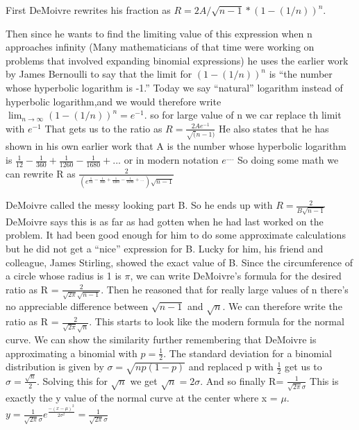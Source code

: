 \documentclass{article}
\begin{document}
First DeMoivre rewrites his fraction as   $ R= 2A/ \sqrt{n-1} * (1-(1/n))^{n} $.

Then since he wants to find the limiting value of this expression when n approaches infinity (Many mathematicians of that time were working on problems that involved expanding binomial expressions) he uses the earlier work by James Bernoulli to say that the limit for $ (1-(1/n))^{n} $ is “the number
whose hyperbolic logarithm is -1.” Today we say “natural” logarithm instead of hyperbolic logarithm,and we would therefore write $ \lim_{n\to\infty}  (1-(1/n))^{n}  = e^{-1}  $.
so for large value of n we car replace th limit with $ e^{-1} $
That gets us to the ratio as $ R=  \frac {2Ae^{-1}}{\sqrt(n-1)} $
He also states that he has shown in his own earlier work that A is the number whose hyperbolic logarithm is $ \frac{1}{12} - \frac{1}{360} + \frac{1}{1260} - \frac{1}{1680} + ...  $  or in modern notation $ e^{....} $
So doing some math we can rewrite R as $ \frac{2}{(e^{ \frac{1}{12} - \frac{1}{360} + \frac{1}{1260} - \frac{1}{1680} + ... }) \sqrt{n-1}  } $

DeMoivre called the messy looking part B. So he ends up with $ R= \frac{2}{B \sqrt{n-1}} $
DeMoivre says this is as far as had gotten when he had last worked on the problem.
It had been good enough for him to do some approximate calculations but he did not get a “nice” expression for B.
Lucky for him, his friend and colleague,
James Stirling, showed the exact value of B.
Since the circumference of a circle whose radius is 1 is $ \pi $, we can write DeMoivre’s formula for the desired ratio as R = $ \frac{2}{ \sqrt{2\pi}\sqrt{n-1} } $.
Then he reasoned that for really large values of n there’s no appreciable difference between $ \sqrt{n-1} $ and  $ \sqrt{n}$.
We can therefore write the ratio as  R = $ \frac{2}{ \sqrt{2\pi}\sqrt{n} } $.
This starts to look like the modern formula for the normal curve.
We can show the similarity further remembering that DeMoivre is approximating a binomial with $ p= \frac{1}{2} $. The standard deviation for a binomial distribution is given by $ \sigma = \sqrt{np(1-p)} $ and replaced p with $ \frac{1}{2} $  get us to $ \sigma = \frac{ \sqrt{n}}{2} $.
Solving this for $ \sqrt{n}$ we get $ \sqrt{n}= 2\sigma $.
And so finally R= $ \frac{1}{\sqrt{2\pi}\sigma}$
This is exactly the y value of the normal curve at the center where x = $ \mu $.
$ y= \frac{1}{\sqrt{2\pi}\sigma }e^{{\frac{-(x-\mu)^{2}}{2\sigma^{2}}}}=  \frac{1}{\sqrt{2\pi}\sigma} $
\end{document}

